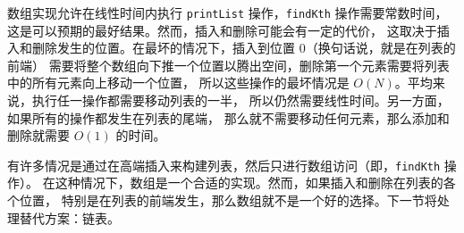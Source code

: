 \documentclass[a4paper]{ctexart}
\theoremstyle{definition}
\theoremstyle{definition}
\begin{document}
数组实现允许在线性时间内执行 \verb|printList| 操作，\verb|findKth| 操作需要常数时间，
这是可以预期的最好结果。然而，插入和删除可能会有一定的代价，
这取决于插入和删除发生的位置。在最坏的情况下，插入到位置 $0$（换句话说，就是在列表的前端）
需要将整个数组向下推一个位置以腾出空间，删除第一个元素需要将列表中的所有元素向上移动一个位置，
所以这些操作的最坏情况是 $O(N)$。平均来说，执行任一操作都需要移动列表的一半，
所以仍然需要线性时间。另一方面，如果所有的操作都发生在列表的尾端，
那么就不需要移动任何元素，那么添加和删除就需要 $O(1)$ 的时间。

有许多情况是通过在高端插入来构建列表，然后只进行数组访问（即，\verb|findKth| 操作）。
在这种情况下，数组是一个合适的实现。然而，如果插入和删除在列表的各个位置，
特别是在列表的前端发生，那么数组就不是一个好的选择。下一节将处理替代方案：链表。






\end{document}
